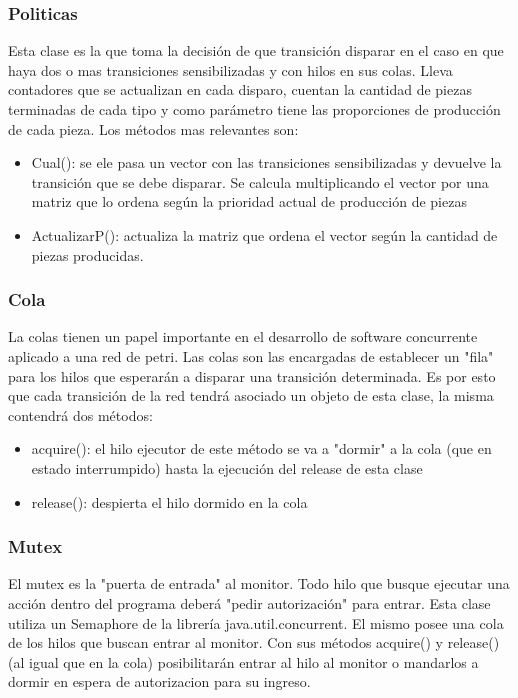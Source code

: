 \documentclass[10pt, a4paper,notitlepage]{article}
\begin{document}
\subsubsection{Politicas}
Esta clase es la que toma la decisión de que transición disparar en el caso en que haya dos o mas transiciones sensibilizadas y con hilos en sus colas. Lleva contadores que se actualizan en cada disparo, cuentan la cantidad de piezas terminadas de cada tipo y como parámetro tiene las proporciones de producción de cada pieza. Los métodos mas relevantes son:
\begin{itemize}
	\item Cual(): se ele pasa un vector con las transiciones sensibilizadas y devuelve la transición que se debe disparar. Se calcula multiplicando el vector por una matriz que lo ordena según la prioridad actual de producción de piezas
	\item ActualizarP(): actualiza la matriz que ordena el vector según la cantidad de piezas producidas.
\end{itemize}
\subsubsection{Cola}
La colas tienen un papel importante en el desarrollo de software concurrente aplicado a una red de petri. Las colas son las encargadas de establecer un "fila" para los hilos que esperarán a disparar una transición determinada.
Es por esto que cada transición de la red tendrá asociado un objeto de esta clase, la misma contendrá dos métodos:
\begin{itemize}
	\item acquire(): el hilo ejecutor de este método se va a "dormir" a la cola (que en estado interrumpido) hasta la ejecución del release de esta clase
	\item release(): despierta el hilo dormido en la cola
\end{itemize}

\subsubsection{Mutex}
El mutex es la "puerta de entrada" al monitor. Todo hilo que busque ejecutar una acción dentro del programa deberá "pedir autorización" para entrar.
Esta clase utiliza un Semaphore de la librería java.util.concurrent. El mismo posee una cola de los hilos que buscan entrar al monitor. Con sus métodos acquire() y release() (al igual que en la cola) posibilitarán entrar al hilo al monitor o mandarlos a dormir en espera de autorizacion para su ingreso.
\end{document}
